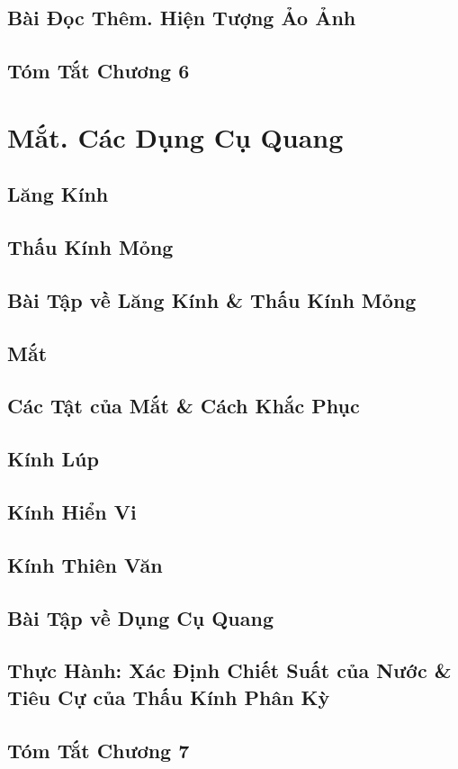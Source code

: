 \documentclass[oneside]{book}
\numberwithin{equation}{section}
\begin{document}
\section{Bài Đọc Thêm. Hiện Tượng Ảo Ảnh}

\section{Tóm Tắt Chương 6}


\chapter{Mắt. Các Dụng Cụ Quang}

\section{Lăng Kính}

\section{Thấu Kính Mỏng}

\section{Bài Tập về Lăng Kính \& Thấu Kính Mỏng}

\section{Mắt}

\section{Các Tật của Mắt \& Cách Khắc Phục}

\section{Kính Lúp}

\section{Kính Hiển Vi}

\section{Kính Thiên Văn}

\section{Bài Tập về Dụng Cụ Quang}

\section{Thực Hành: Xác Định Chiết Suất của Nước \& Tiêu Cự của Thấu Kính Phân Kỳ}

\section{Tóm Tắt Chương 7}


\printbibliography[heading=bibintoc]
	
\end{document}
